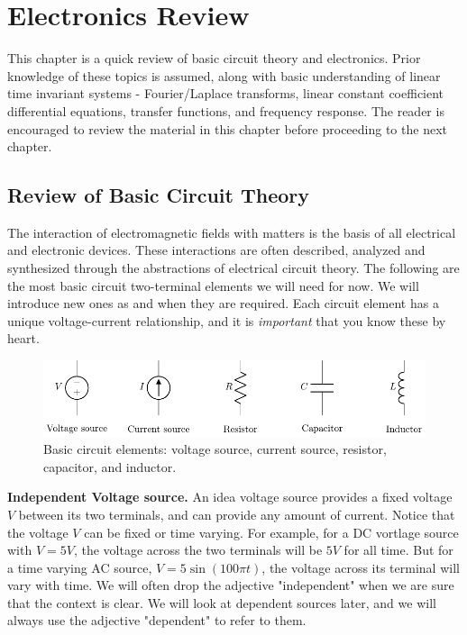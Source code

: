 \chapter{Electronics Review}\label{chp:electronics}

This chapter is a quick review of basic circuit theory and electronics. Prior knowledge of these topics is assumed, along with basic understanding of linear time invariant systems - Fourier/Laplace transforms, linear constant coefficient differential equations, transfer functions, and frequency response. The reader is encouraged to review the material in this chapter before proceeding to the next chapter.

\section{Review of Basic Circuit Theory}
The interaction of electromagnetic fields with matters is the basis of all electrical and electronic devices. These interactions are often described, analyzed and synthesized through the abstractions of electrical circuit theory. The following are the most basic circuit two-terminal elements we will need for now. We will introduce new ones as and when they are required. Each circuit element has a unique voltage-current relationship, and it is \emph{important} that you know these by heart.

\begin{figure}[b]
    \centering
    \includegraphics[width=\textwidth]{figure/fig02-01.pdf}
    \caption{Basic circuit elements: voltage source, current source, resistor, capacitor, and inductor.}
    \label{fig:02-01}
\end{figure}

\noindent\textbf{Independent Voltage source.} An idea voltage source provides a fixed voltage $V$ between its two terminals, and can provide any amount of current. Notice that the voltage $V$ can be fixed or time varying. For example, for a DC vortlage source with $V = 5V$, the voltage across the two terminals will be $5V$ for all time. But for a time varying AC source, $V = 5 \sin \left( 100\pi t \right)$, the voltage across its terminal will vary with time. We will often drop the adjective "independent" when we are sure that the context is clear. We will look at dependent sources later, and we will always use the adjective "dependent" to refer to them.

